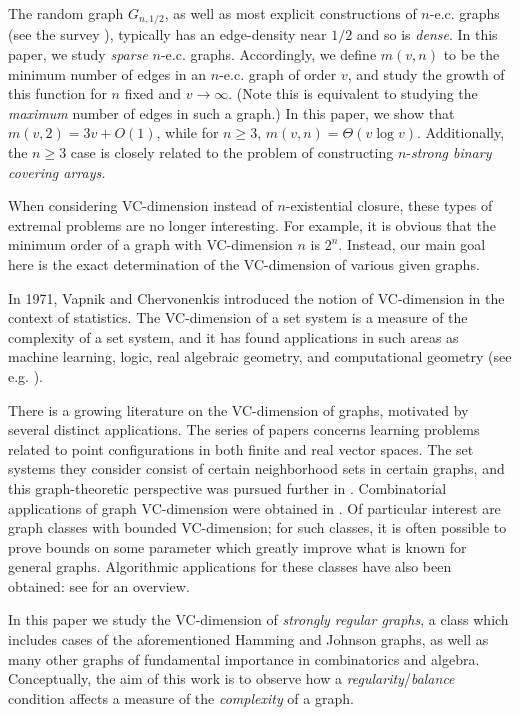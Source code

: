 \documentclass{article}
\theoremstyle{definition}
\begin{document}
The random graph $G_{n,1/2}$, as well as most explicit constructions of $n$-e.c. graphs (see the survey \cite{bonato2009search}), typically has an edge-density near $1/2$ and so is \textit{dense}. In this paper, we study \textit{sparse} $n$-e.c. graphs. Accordingly, we define $m(v,n)$ to be the minimum number of edges in an $n$-e.c. graph of order $v$, and study the growth of this function for $n$ fixed and $v\to\infty$. (Note this is equivalent to studying the \textit{maximum} number of edges in such a graph.) In this paper, we show that $m(v,2)=3v+O(1)$, while for $n\ge 3$, $m(v,n)=\Theta(v\log v)$. Additionally, the $n\ge 3$ case is closely related to the problem of constructing $n$-\textit{strong binary covering arrays.}

When considering VC-dimension instead of $n$-existential closure, these types of extremal problems are no longer interesting. For example, it is obvious that the minimum order of a graph with VC-dimension $n$ is $2^n$. Instead, our main goal here is the exact determination of the VC-dimension of various given graphs. 

In 1971, Vapnik and Chervonenkis \cite{vapnik1971uniform} introduced the notion of VC-dimension in the context of statistics. The VC-dimension of a set system is a measure of the complexity of a set system, and it has found applications in such areas as machine learning, logic, real algebraic geometry, and computational geometry (see e.g. \cite[Section 14.4]{alon2016probabilistic}).

There is a growing literature on the VC-dimension of graphs, motivated by several distinct applications. The series of papers \cite{fitzpatrick2024vc,iosevich2025vc,iosevich2023dot} concerns learning problems related to point configurations in both finite and real vector spaces. The set systems they consider consist of certain neighborhood sets in certain graphs, and this graph-theoretic perspective was pursued further in \cite{housholder2026vc,pham2025vc}. Combinatorial applications of graph VC-dimension were obtained in \cite{alon2007efficient,fox2020bounded,fox2019erdHos,janzer2024zarankiewicz,lovasz2010regularity,nguyen2025induced}. Of particular interest are graph classes with bounded VC-dimension; for such classes, it is often possible to prove bounds on some parameter which greatly improve what is known for general graphs. Algorithmic applications for these classes have also been obtained: see \cite{coudert2024practical} for an overview.

In this paper we study the VC-dimension of \textit{strongly regular graphs}, a class which includes cases of the aforementioned Hamming and Johnson graphs, as well as many other graphs of fundamental importance in combinatorics and algebra. Conceptually, the aim of this work is to observe how a \textit{regularity}/\textit{balance} condition affects a measure of the \textit{complexity} of a graph.
\end{document}
